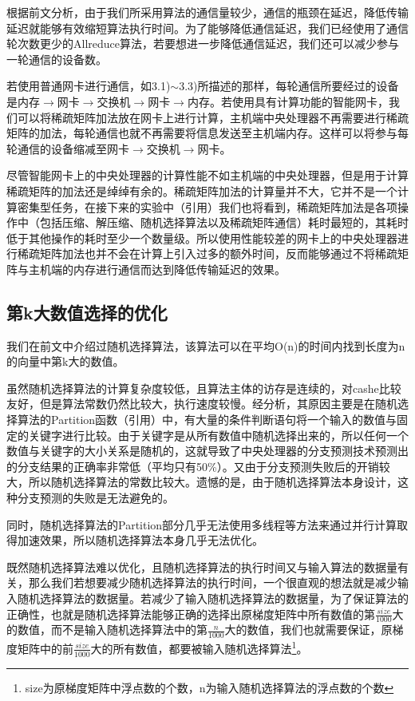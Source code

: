 根据前文分析，由于我们所采用算法的通信量较少，通信的瓶颈在延迟，降低传输延迟就能够有效缩短算法执行时间。为了能够降低通信延迟，我们已经使用了通信轮次数更少的Allreduce算法，若要想进一步降低通信延迟，我们还可以减少参与一轮通信的设备数。

若使用普通网卡进行通信，如3.1)$\sim$3.3)所描述的那样，每轮通信所要经过的设备是内存$\rightarrow$网卡$\rightarrow$交换机$\rightarrow$网卡$\rightarrow$内存。若使用具有计算功能的智能网卡，我们可以将稀疏矩阵加法放在网卡上进行计算，主机端中央处理器不再需要进行稀疏矩阵的加法，每轮通信也就不再需要将信息发送至主机端内存。这样可以将参与每轮通信的设备缩减至网卡$\rightarrow$交换机$\rightarrow$网卡。

尽管智能网卡上的中央处理器的计算性能不如主机端的中央处理器，但是用于计算稀疏矩阵的加法还是绰绰有余的。稀疏矩阵加法的计算量并不大，它并不是一个计算密集型任务，在接下来的实验中（引用）我们也将看到，稀疏矩阵加法是各项操作中（包括压缩、解压缩、随机选择算法以及稀疏矩阵通信）耗时最短的，其耗时低于其他操作的耗时至少一个数量级。所以使用性能较差的网卡上的中央处理器进行稀疏矩阵加法也并不会在计算上引入过多的额外时间，反而能够通过不将稀疏矩阵与主机端的内存进行通信而达到降低传输延迟的效果。

\subsection{第k大数值选择的优化}
我们在前文中介绍过随机选择算法，该算法可以在平均O(n)的时间内找到长度为n的向量中第k大的数值。

虽然随机选择算法的计算复杂度较低，且算法主体的访存是连续的，对cashe比较友好，但是算法常数仍然比较大，执行速度较慢。经分析，其原因主要是在随机选择算法的Partition函数（引用）中，有大量的条件判断语句将一个输入的数值与固定的关键字进行比较。由于关键字是从所有数值中随机选择出来的，所以任何一个数值与关键字的大小关系是随机的，这就导致了中央处理器的分支预测技术预测出的分支结果的正确率非常低（平均只有50\%）。又由于分支预测失败后的开销较大，所以随机选择算法的常数比较大。遗憾的是，由于随机选择算法本身设计，这种分支预测的失败是无法避免的。

同时，随机选择算法的Partition部分几乎无法使用多线程等方法来通过并行计算取得加速效果，所以随机选择算法本身几乎无法优化。

既然随机选择算法难以优化，且随机选择算法的执行时间又与输入算法的数据量有关，那么我们若想要减少随机选择算法的执行时间，一个很直观的想法就是减少输入随机选择算法的数据量。若减少了输入随机选择算法的数据量，为了保证算法的正确性，也就是随机选择算法能够正确的选择出原梯度矩阵中所有数值的第$\frac{size}{1000}$大的数值，而不是输入随机选择算法中的第$\frac{n}{1000}$大的数值，我们也就需要保证，原梯度矩阵中的前$\frac{size}{1000}$大的所有数值，都要被输入随机选择算法\footnote{size为原梯度矩阵中浮点数的个数，n为输入随机选择算法的浮点数的个数}。

